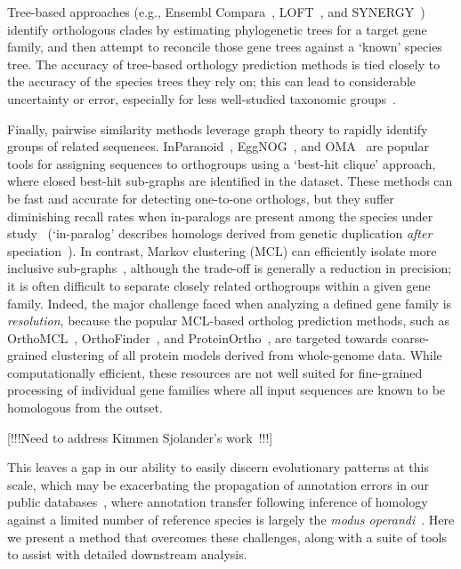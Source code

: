\documentclass[twocolumn]{bmcart}  %
\begin{document}
Tree-based approaches (e.g., Ensembl Compara~\cite{Vilella:2009ju}, LOFT~\cite{vanderHeijden:2007bo}, and SYNERGY~\cite{Wapinski:2007fa}) identify orthologous clades by estimating phylogenetic trees for a target gene family, and then attempt to reconcile those gene trees against a `known' species tree.
The accuracy of tree-based orthology prediction methods is tied closely to the accuracy of the species trees they rely on;
this can lead to considerable uncertainty or error, especially for less well-studied taxonomic groups~\cite{Xu:2016ek}.

Finally, pairwise similarity methods leverage graph theory to rapidly identify groups of related sequences.
InParanoid~\cite{OBrien:2005cy}, EggNOG~\cite{Jensen:2007cc}, and OMA~\cite{Roth:2009iu} are popular tools for assigning sequences to orthogroups using a `best-hit clique' approach, where closed best-hit sub-graphs are identified in the dataset.
These methods can be fast and accurate for detecting one-to-one orthologs, but they suffer diminishing recall rates when in-paralogs are present among the species under study~\cite{Dalquen:2013fz} (`in-paralog' describes homologs derived from genetic duplication \textit{after} speciation~\cite{Sonnhammer:2002vm,Tekaia:2016ga}).
In contrast, Markov clustering (MCL) can efficiently isolate more inclusive sub-graphs~\cite{VanDongen:kJZ890qx,Enright:2002uq}, although the trade-off is generally a reduction in precision;
it is often difficult to separate closely related orthogroups within a given gene family.
Indeed, the major challenge faced when analyzing a defined gene family is \textit{resolution}, because the popular MCL-based ortholog prediction methods, such as OrthoMCL~\cite{Li:2003en}, OrthoFinder~\cite{Emms:2015ig}, and ProteinOrtho~\cite{Lechner:2011jk}, are targeted towards coarse-grained clustering of all protein models derived from whole-genome data.
While computationally efficient, these resources are not well suited for fine-grained processing of individual gene families where all input sequences are known to be homologous from the outset.

[!!!Need to address Kimmen Sjolander's work~\cite{Brown:2007dp,Krishnamurthy:2007fs}!!!]

This leaves a gap in our ability to easily discern evolutionary patterns at this scale, which may be exacerbating the propagation of annotation errors in our public databases~\cite{Schnoes:2009gb}, where annotation transfer following inference of homology against a limited number of reference species is largely the \textit{modus operandi}~\cite{Aken:2016dl,Mi:2016bw,OLeary:2016cm}.
Here we present a method that overcomes these challenges, along with a suite of tools to assist with detailed downstream analysis.
\end{document}
